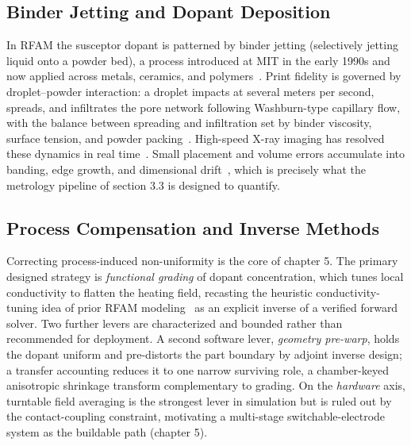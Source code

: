 \subsection{Binder Jetting and Dopant Deposition}
\label{sec:intro_bg_bjam}

In RFAM the susceptor dopant is patterned by binder jetting (selectively jetting
liquid onto a powder bed), a process introduced at MIT in the early 1990s and now
applied across metals, ceramics, and
polymers~\cite{mostafaei2021binderjetting,miyanaji2016porcelainBJ,du2020ceramicbj}.
Print fidelity is governed by droplet--powder interaction: a droplet impacts at
several meters per second, spreads, and infiltrates the pore network following
Washburn-type capillary flow, with the balance between spreading and infiltration
set by binder viscosity, surface tension, and powder
packing~\cite{Derby2010InkjetReview,colton2021droplet,holman2002spreading,barui2020inkpowder}.
High-speed X-ray imaging has resolved these dynamics in real
time~\cite{parab2019xray}. Small placement and volume errors accumulate into
banding, edge growth, and dimensional drift~\cite{Zhao2023BinderJetDefects,zago2024mbjaccuracy,Thalheim2023DropPlacement},
which is precisely what the metrology pipeline of section 3.3 is designed
to quantify.

\subsection{Process Compensation and Inverse Methods}
\label{sec:intro_bg_compensation}

Correcting process-induced non-uniformity is the core of chapter 5.
The primary designed strategy is \emph{functional grading} of dopant
concentration, which tunes local conductivity to flatten the heating field,
recasting the heuristic conductivity-tuning idea of prior RFAM
modeling~\cite{allison2022computational} as an explicit inverse of a verified
forward solver. Two further levers are characterized and
bounded rather than recommended for deployment. A second software lever, \emph{geometry pre-warp},
holds the dopant uniform and pre-distorts the part boundary by adjoint inverse
design; a transfer accounting reduces it to one narrow surviving role, a
chamber-keyed anisotropic shrinkage transform complementary to grading. On the
\emph{hardware} axis, turntable field averaging is the strongest lever in simulation
but is ruled out by the contact-coupling constraint, motivating a multi-stage
switchable-electrode system as the buildable path (chapter 5).

